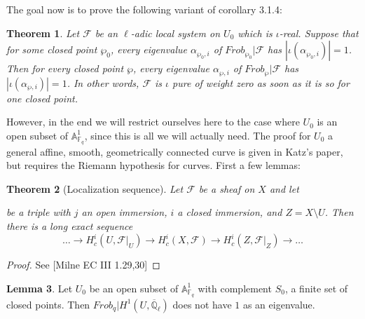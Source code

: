 \documentclass{ucbthesis}
\newtheorem{thm}{Theorem}[section]
\theoremstyle{definition}
\theoremstyle{theorem}
\newtheorem{lem}[thm]{Lemma}
\begin{document}
The goal now is to prove the following variant of corollary 3.1.4:

\begin{thm}
Let $\mathcal{F}$ be an $\ell$-adic local system on $U_{0}$ which is $\iota$-real. Suppose that for some closed point $\wp_{0}$, every eigenvalue $\alpha_{\wp_{0},i}$ of $Frob_{\wp_0}|\mathcal{F}$ has $|\iota(\alpha_{\wp_{0},i})| = 1$. Then for every closed point $\wp$, every eigenvalue $\alpha_{\wp,i}$ of $Frob_{\wp}|\mathcal{F}$ has $|\iota(\alpha_{\wp,i})|=1$. In other words, $\mathcal{F}$ is $\iota$ pure of weight zero as soon as it is so for one closed point. 
\end{thm}

However, in the end we will restrict ourselves here to the case where $U_{0}$ is an open subset of $\mathbb{A}^{1}_{\mathbb{F}_q}$, since this is all we will actually need. The proof for $U_{0}$ a general affine, smooth, geometrically connected curve is given in Katz's paper, but requires the Riemann hypothesis for curves. First a few lemmas:

\begin{thm}[Localization sequence]
Let $\mathcal{F}$ be a sheaf on $X$ and let 
be a triple with $j$ an open immersion, $i$ a closed immersion, and $Z = X\setminus U$. Then there is a long exact sequence $$\ldots \rightarrow H^{i}_{c}(U,\mathcal{F}|_{U}) \rightarrow H^{i}_{c}(X,\mathcal{F}) \rightarrow H^{i}_{c}(Z,\mathcal{F}|_{Z}) \rightarrow \ldots$$
\end{thm}
\begin{proof}
See [Milne EC III 1.29,30]
\end{proof}

\begin{lem}
Let $U_{0}$ be an open subset of $\mathbb{A}^{1}_{\mathbb{F}_q}$ with complement $S_{0}$, a finite set of closed points. Then $Frob_{q}|H^{1}(U,\overline{\mathbb{Q}}_{\ell})$ does not have $1$ as an eigenvalue. 
\end{lem}
\end{document}
